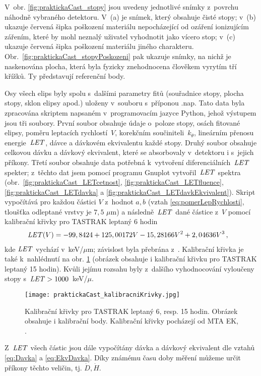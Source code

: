 V~obr. \ref{fig:praktickaCast_stopy} jsou uvedeny jednotlivé snímky z~povrchu náhodně vybraného detektoru. V~(a) je snímek, který obsahuje čisté stopy; v~(b) ukazuje červená šipka poškození materiálu nepocházející od ozáření ionizujícím zářením, které by mohl neznalý uživatel vyhodnotit jako vícero stop; v~(c) ukazuje červená šipka poškození materiálu jiného charakteru. Obr.~\ref{fig:praktickaCast_stopyPoskozeni} pak ukazuje snímky, na nichž je naskenována plocha, která byla fyzicky znehodnocena člověkem vyrytím tří křížků. Ty představují referenční body. 

Osy všech elips byly spolu s~dalšími parametry fitů (souřadnice stopy, plocha stopy, sklon elipsy apod.) uloženy v~souboru s~příponou .nap. Tato data byla zpracována skriptem napsaném v~programovacím jazyce Python, jehož výstupem jsou tři soubory. První soubor obsahuje údaje o~poloze stopy, osách fitované elipsy, poměru leptacích rychlostí~$V$, korekčním součiniteli~$k_{\theta}$, lineárním přenosu energie~$\mathit{LET}$, dávce a dávkovém ekvivalentu každé stopy. Druhý soubor obsahuje celkovou dávku a dávkový ekvivalent, které se absorbovaly v~detektoru i s~jejich příkony. Třetí soubor obsahuje data potřebná k~vytvoření diferenciálních~$\mathit{LET}$ spekter; z~těchto dat jsem pomocí programu Gnuplot vytvořil~$\mathit{LET}$ spektra (obr.~\ref{fig:praktickaCast_LETcetnost}, \ref{fig:praktickaCast_LETfluence},
\ref{fig:praktickaCast_LETdavka} a \ref{fig:praktickaCast_LETdavkEkvivalent}). Skript vypočítává pro každou částici $V$ z~hodnot $a,b$ (vztah \eqref{eq:pomerLepRychlosti}, tloušťka odleptané vrstvy je $7,5$
$\mu$m) a následně~$\mathit{LET}$ dané částice z~$V$ pomocí kalibrační křivky pro TASTRAK leptaný 6 hodin
\begin{align}
  \mathit{LET}(V) &= -99,8424+125,00172  V-15,28166  V^2+2,04636  V^3\,,\label{eq:kalibracniKrivkaSestHod}
\end{align}
kde $\mathit{LET}$ vychází v~keV/$\mu$m; závislost byla přebrána z~\cite{ssntd}. Kalibrační křivka je také k~nahlédnutí na obr. \ref{fig:praktickaCast_kalibracniKrivky} (obrázek obsahuje i kalibrační křivku pro TASTRAK leptaný 15 hodin). Kvůli jejímu rozsahu byly z~dalšího vyhodnocování vyloučeny stopy s~$\mathit{LET}>\nobreak1000$~keV/$\mu$.
\begin{figure}[ht]
  \centering
  \texttt{[image: praktickaCast\_kalibracniKrivky.jpg]}
  \caption{Kalibrační křivky pro TASTRAK leptaný 6, resp. 15 hodin. Obrázek obsahuje i kalibrační body. Kalibrační křivky pocházejí od MTA EK, \cite{ssntd}.}
  \label{fig:praktickaCast_kalibracniKrivky}
\end{figure}
Z~$\mathit{LET}$ všech částic jsou dále vypočítány dávka a dávkový ekvivalent dle vztahů \eqref{eq:Davka} a \eqref{eq:EkvDavka}. Díky známému času doby měření můžeme určit příkony těchto veličin, tj. $\dot{D}, \dot{H}$.

